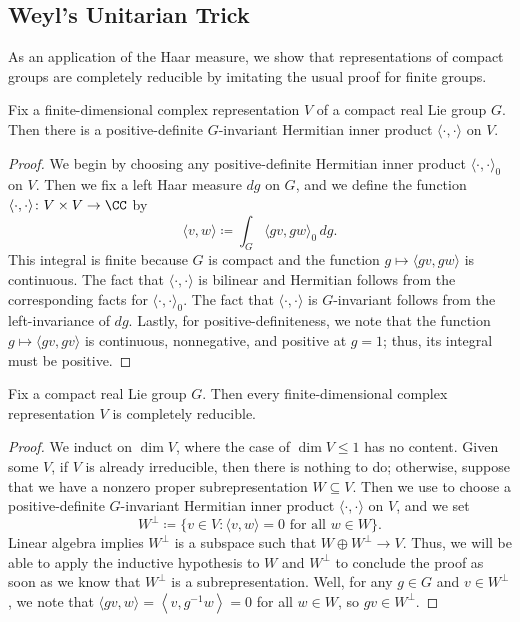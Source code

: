 \documentclass{amsart}
\begin{document}
\subsection{Weyl's Unitarian Trick}
As an application of the Haar measure, we show that representations of compact groups are completely reducible by imitating the usual proof for finite groups.
\begin{proposition} \label{prop:weyl-unitary}
	Fix a finite-dimensional complex representation $V$ of a compact real Lie group $G$. Then there is a positive-definite $G$-invariant Hermitian inner product $\langle\cdot,\cdot\rangle$ on $V$.
\end{proposition}
\begin{proof}
	We begin by choosing any positive-definite Hermitian inner product $\langle\cdot,\cdot\rangle_0$ on $V$. Then we fix a left Haar measure $dg$ on $G$, and we define the function $\langle\cdot,\cdot\rangle\colon V\times V\to\CC$ by
	\[\langle v,w\rangle\coloneqq\int_G\langle gv,gw\rangle_0\,dg.\]
	This integral is finite because $G$ is compact and the function $g\mapsto\langle gv,gw\rangle$ is continuous. The fact that $\langle\cdot,\cdot\rangle$ is bilinear and Hermitian follows from the corresponding facts for $\langle\cdot,\cdot\rangle_0$. The fact that $\langle\cdot,\cdot\rangle$ is $G$-invariant follows from the left-invariance of $dg$. Lastly, for positive-definiteness, we note that the function $g\mapsto\langle gv,gv\rangle$ is continuous, nonnegative, and positive at $g=1$; thus, its integral must be positive.
\end{proof}
\begin{corollary} \label{cor:compact-semisimple}
	Fix a compact real Lie group $G$. Then every finite-dimensional complex representation $V$ is completely reducible.
\end{corollary}
\begin{proof}
	We induct on $\dim V$, where the case of $\dim V\le1$ has no content. Given some $V$, if $V$ is already irreducible, then there is nothing to do; otherwise, suppose that we have a nonzero proper subrepresentation $W\subseteq V$. Then we use  to choose a positive-definite $G$-invariant Hermitian inner product $\langle\cdot,\cdot\rangle$ on $V$, and we set
	\[W^\perp\coloneqq\{v\in V:\langle v,w\rangle=0\text{ for all }w\in W\}.\]
	Linear algebra implies $W^\perp$ is a subspace such that $W\oplus W^\perp\to V$. Thus, we will be able to apply the inductive hypothesis to $W$ and $W^\perp$ to conclude the proof as soon as we know that $W^\perp$ is a subrepresentation. Well, for any $g\in G$ and $v\in W^\perp$, we note that $\langle gv,w\rangle=\left\langle v,g^{-1}w\right\rangle=0$ for all $w\in W$, so $gv\in W^\perp$.
\end{proof}
\end{document}
